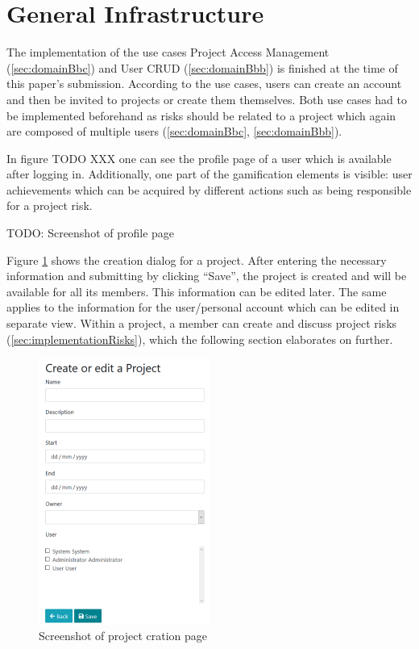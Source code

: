 \section{General Infrastructure}
\label{sec:implementationInfra}

The implementation of the use cases Project Access Management (\ref{sec:domainBbc}) and User CRUD (\ref{sec:domainBbb}) is finished at the time of this paper's submission. According to the use cases, users can create an account and then be invited to projects or create them themselves. Both use cases had to be implemented beforehand as risks should be related to a project which again are composed of multiple users (\ref{sec:domainBbc}, \ref{sec:domainBbb}).

In figure TODO XXX one can see the profile page of a user which is available after logging in. Additionally, one part of the gamification elements is visible: user achievements which can be acquired by different actions such as being responsible for a project risk.

TODO: Screenshot of profile page

Figure \ref{fig:ShotProjectCreation} shows the creation dialog for a project. After entering the necessary information and submitting by clicking “Save”, the project is created and will be available for all its members. This information can be edited later. The same applies to the information for the user/personal account which can be edited in separate view. Within a project, a member can create and discuss project risks (\ref{sec:implementationRisks}), which the following section elaborates on further.

\begin{figure}[H]
	\centering
	\includegraphics[width=0.5\textwidth]{Assets/implementation_shots/CreateProject.png}
	\caption{Screenshot of project cration page}
	\label{fig:ShotProjectCreation}
\end{figure}

